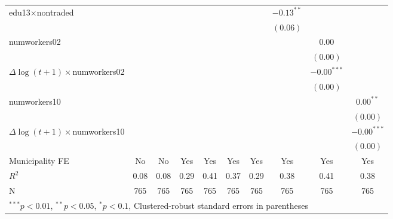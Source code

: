 \begin{tabular}{l c c c c c c c c c }
edu13$\times$nontraded&              &              &              &               &               &              & $-0.13^{**}$  &               &               \\
                      &              &              &              &               &               &              & $(0.06)$      &               &               \\
numworkers02          &              &              &              &               &               &              &               & $0.00$        &               \\
                      &              &              &              &               &               &              &               & $(0.00)$      &               \\
$\Delta\log(t+1)\times$numworkers02  &              &              &               &               &               &              &               & $-0.00^{***}$ &               \\
                      &              &              &              &               &               &              &               & $(0.00)$      &               \\
numworkers10          &              &              &              &               &               &              &               &               & $0.00^{**}$   \\
                      &              &              &              &               &               &              &               &               & $(0.00)$      \\
$\Delta\log(t+1)\times$numworkers10  &              &              &               &               &               &              &               &               & $-0.00^{***}$ \\
                      &              &              &              &               &               &              &               &               & $(0.00)$      \\
\hline
Municipality FE       &No&No&Yes&Yes&Yes&Yes&Yes&Yes&Yes\\ 
\hline
$R^2$                 & 0.08         & 0.08         & 0.29         & 0.41          & 0.37          & 0.29         & 0.38          & 0.41          & 0.38          \\
N                     & 765          & 765          & 765          & 765           & 765           & 765          & 765           & 765           & 765           \\
\hline
\multicolumn{10}{l}{\scriptsize{$^{***}p<0.01$, $^{**}p<0.05$, $^*p<0.1$, Clustered-robust standard errors in parentheses}}
\end{tabular}
